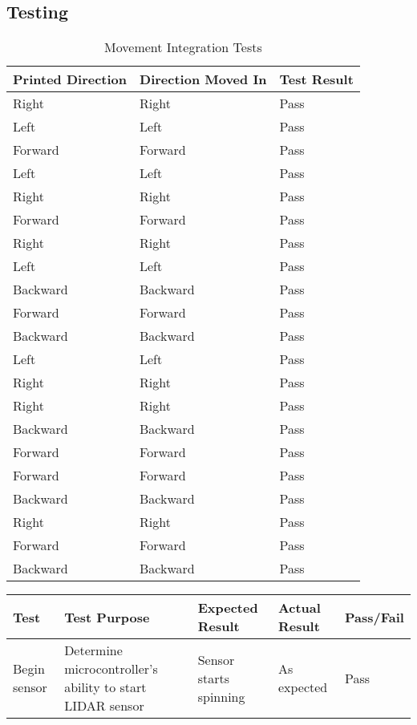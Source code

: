 \begin{appendices}
	\chapter{Testing}
	\begin{landscape}
	\label{testingappendices}
		\label{testing:testlogs}
					\begin{table}[h!]
						\centering
						\begin{tabular}{| l | l | l |} 
							\hline
							Printed Direction & Direction Moved In & Test Result  \\ [0.5ex] 
							\hline
							Right & Right & Pass   \\
							Left & Left & Pass   \\ 
							Forward & Forward & Pass   \\ 
							Left & Left & Pass   \\ 
							Right & Right & Pass   \\ 
							Forward & Forward & Pass   \\ 
							Right & Right & Pass   \\ 
							Left & Left & Pass   \\ 
							Backward & Backward & Pass   \\ 
							Forward & Forward & Pass   \\ 
							Backward & Backward & Pass   \\ 
							Left & Left & Pass   \\ 
							Right & Right & Pass   \\ 
							Right & Right & Pass  \\ 
							Backward & Backward & Pass   \\ 
							Forward & Forward & Pass   \\ 
							Forward & Forward & Pass  \\ 
							Backward & Backward & Pass  \\ 
							Right & Right & Pass   \\ 
							Forward & Forward & Pass   \\ 
							Backward & Backward & Pass   \\ [1ex] 
							\hline
						\end{tabular}	
					\caption{Movement Integration Tests}
					\label{table:movementtestsbasic}	
					\end{table}
				
					\begin{table}[h!]
						\centering
						\begin{tabular}{| p{2.5cm} | p{5cm} | p{4cm} | p{3cm} | p{1.5cm} |} 
							\hline
							Test & Test Purpose & Expected Result & Actual Result & Pass/Fail \\ [0.5ex] 
							\hline
							Begin sensor & Determine microcontroller's ability to start LIDAR sensor & Sensor starts spinning & As expected & Pass  \\
							

\end{tabular}
\end{table}
\end{landscape}
\end{appendices}
